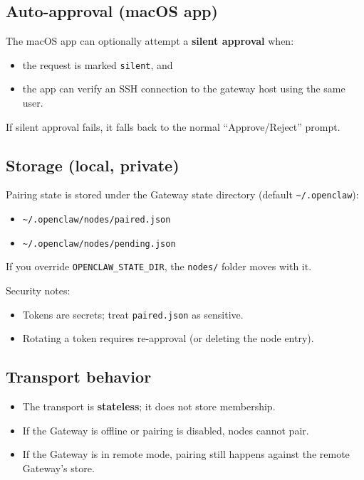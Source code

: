 \subsection{Auto-approval (macOS app)}


The macOS app can optionally attempt a \textbf{silent approval} when:

\begin{itemize}
  \item the request is marked \texttt{silent}, and
  \item the app can verify an SSH connection to the gateway host using the same user.
\end{itemize}


If silent approval fails, it falls back to the normal “Approve/Reject” prompt.

\subsection{Storage (local, private)}


Pairing state is stored under the Gateway state directory (default \texttt{\textasciitilde{}/.openclaw}):

\begin{itemize}
  \item \texttt{\textasciitilde{}/.openclaw/nodes/paired.json}
  \item \texttt{\textasciitilde{}/.openclaw/nodes/pending.json}
\end{itemize}


If you override \texttt{OPENCLAW\_STATE\_DIR}, the \texttt{nodes/} folder moves with it.

Security notes:

\begin{itemize}
  \item Tokens are secrets; treat \texttt{paired.json} as sensitive.
  \item Rotating a token requires re-approval (or deleting the node entry).
\end{itemize}


\subsection{Transport behavior}


\begin{itemize}
  \item The transport is \textbf{stateless}; it does not store membership.
  \item If the Gateway is offline or pairing is disabled, nodes cannot pair.
  \item If the Gateway is in remote mode, pairing still happens against the remote Gateway’s store.
\end{itemize}



